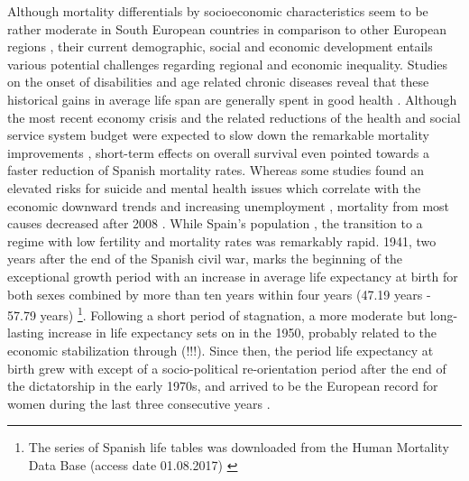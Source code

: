 \documentclass[a4paper,10pt,oneside,english]{article}
\begin{document}
Although mortality differentials by socioeconomic characteristics seem to be rather moderate in South European countries in comparison to other European regions \citep{RN214}, their current demographic, social and economic development entails various potential challenges regarding regional and economic inequality.
Studies on the onset of disabilities and age related chronic diseases reveal that these historical gains in average life span are generally spent in good health \citep{RN107}. Although the most recent economy crisis and the related reductions of the health and social service system budget were expected to slow down the remarkable mortality improvements \citep{RN116,RN141}, short-term effects on overall survival even pointed towards a faster reduction of Spanish mortality rates. Whereas some studies found an elevated risks for suicide and mental health issues which correlate with the economic downward trends and increasing unemployment \citep{RN180,RN176}, mortality from most causes decreased after 2008 \citep{RN182}.
While Spain's population , the transition to a regime with low fertility and mortality rates was remarkably rapid. 1941, two years after the end of the Spanish civil war, marks the beginning of the exceptional growth period with an increase in average life expectancy at birth for both sexes combined by more than ten years within four years (47.19 years - 57.79 years) \footnote{The series of Spanish life tables was downloaded from the Human Mortality Data Base (access date 01.08.2017) \cite{RN21}}. Following a short period of stagnation, a more moderate but long-lasting increase in life expectancy sets on in the 1950, probably related to the economic stabilization through (!!!). Since then, the period life expectancy at birth grew with except of a socio-political re-orientation period after the end of the dictatorship in the early 1970s, and arrived to be the European record for women during the last three consecutive years \citep{RN114,RN105}. 
\end{document}
